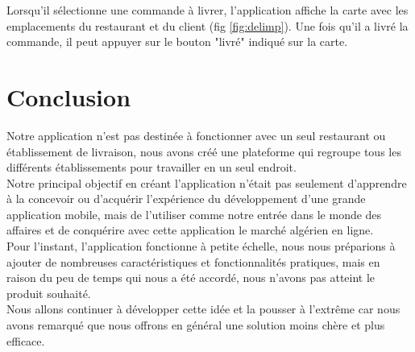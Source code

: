 \documentclass[french, a4paper, 12pt]{report}
\begin{document}
		Lorsqu'il sélectionne une commande à livrer, l'application affiche la carte avec les emplacements du restaurant et du client (fig \ref{fig:delimp}).
Une fois qu'il a livré la commande, il peut appuyer sur le bouton "livré" indiqué sur la carte.

\newpage
\chapter*{Conclusion}
Notre application n'est pas destinée à fonctionner avec un seul restaurant ou établissement de livraison, nous avons créé une plateforme qui regroupe tous les différents établissements pour travailler en un seul endroit.\\


Notre principal objectif en créant l'application n'était pas seulement d'apprendre à la concevoir ou d'acquérir l'expérience du développement d'une grande application mobile, mais de l'utiliser comme notre entrée dans le monde des affaires et de conquérire avec cette application le marché algérien en ligne.\\


Pour l'instant, l'application fonctionne à petite échelle, nous nous préparions à ajouter de nombreuses caractéristiques et fonctionnalités pratiques, mais en raison du peu de temps qui nous a été accordé, nous n'avons pas atteint le produit souhaité.\\


Nous allons continuer à développer cette idée et la pousser à l'extrême car nous avons remarqué que nous offrons en général une solution moins chère et plus efficace.


\newpage
\begin{thebibliography}{300}
\end{thebibliography}
\end{document}

